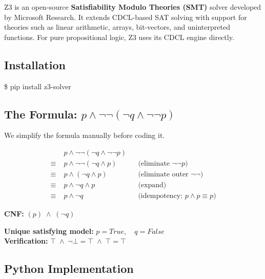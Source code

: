 \documentclass[11pt, a4paper]{article}
\begin{document}
Z3 is an open-source \textbf{Satisfiability Modulo Theories (SMT)} solver
developed by Microsoft Research.
It extends CDCL-based SAT solving with support for theories such as linear
arithmetic, arrays, bit-vectors, and uninterpreted functions.
For pure propositional logic, Z3 uses its CDCL engine directly.

\subsection{Installation}

\begin{tcolorbox}[codebox]
\$ pip install z3-solver 
\end{tcolorbox}

\subsection{The Formula: $p \land \lnot\lnot(\lnot q \land \lnot\lnot p)$}

We simplify the formula manually before coding it.

\begin{align*}
  &p \land \lnot\lnot(\lnot q \land \lnot\lnot p) \\
  \equiv\;& p \land \lnot\lnot(\lnot q \land p)
            &&\text{(eliminate }\lnot\lnot p\text{)}\\
  \equiv\;& p \land (\lnot q \land p)
            &&\text{(eliminate outer }\lnot\lnot\text{)}\\
  \equiv\;& p \land \lnot q \land p
            &&\text{(expand)}\\
  \equiv\;& p \land \lnot q
            &&\text{(idempotency: }p\land p \equiv p\text{)}
\end{align*}

\textbf{CNF:} $(p)\;\land\;(\lnot q)$

\begin{tcolorbox}[keystyle]
\textbf{Unique satisfying model:} $p = \textit{True},\quad q = \textit{False}$\\[0.3em]
\textbf{Verification:}\;
$\top \;\land\; \lnot\bot = \top \;\land\; \top = \top$ \checkmark
\end{tcolorbox}

\subsection{Python Implementation}
\end{document}
